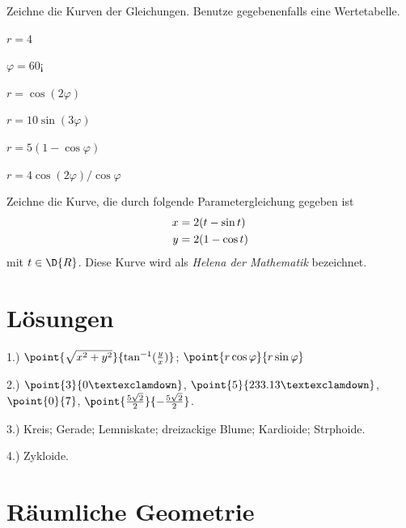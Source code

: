 \documentclass[%
11pt,%
twoside,%
titlepage,%
a4page,%
german,%
headsepline%
]{scrartcl}
\begin{document}
\begin{ueb}
Zeichne die Kurven der Gleichungen. Benutze gegebenenfalls eine Wertetabelle.

  \begin{minipage}{3.5cm}
    \begin{enumeratea}
      \item $r=4$
      \item $\varphi=60¡$
      \item $r=\cos(2\varphi)$
    \end{enumeratea}
  \end{minipage}
  \begin{minipage}{4cm}
    \begin{enumeratea}\addtocounter{enumi}{3}
      \item $r=10\sin(3\varphi)$
      \item $r=5(1-\cos\varphi)$
      \item $r=4\cos(2\varphi)/\cos\varphi$
    \end{enumeratea}
  \end{minipage}
\end{ueb}

\begin{ueb}
Zeichne die Kurve, die durch folgende Parametergleichung gegeben ist
\begin{align}
x&=2(t-\sin t)\notag\\
y&=2(1-\cos t)\notag
\end{align}
mit $t\in\D{R}$.
Diese Kurve wird als \emph{Helena der Mathematik} bezeichnet.
\end{ueb}

\section*{L\"osungen}

\hspace*{2.7ex} 1.) $\point{\sqrt{x^2+y^2}}{\tan^{-1}(\frac{y}{x})}$; $\point{r\cos\varphi}{r\sin\varphi}$

2.) $\point{3}{0¡}$, $\point{5}{233.13¡}$, $\point{0}{7}$, $\point{\frac{5\sqrt{2}}{2}}{-\frac{5\sqrt{2}}{2}}$.

3.) Kreis; Gerade; Lemniskate; dreizackige Blume; Kardioide; Strphoide.

4.) Zykloide.

\clearpage

\appendix

\section{R\"aumliche Geometrie}
\end{document}
